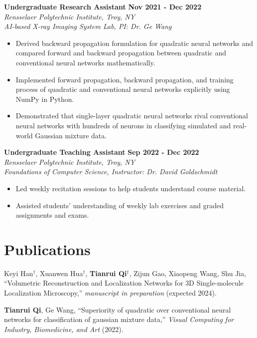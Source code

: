 \documentclass[letterpaper, 11pt]{article}
\newcommand{\subsectionvspace}{\vspace{6pt}}
\begin{document}
    \textbf{Undergraduate Research Assistant} \hfill 
    \textbf{Nov 2021 - Dec 2022} \\
    \textit{Rensselaer Polytechnic Institute, Troy, NY} \\
    \textit{AI-based X-ray Imaging System Lab, PI: Dr. Ge Wang}
    \begin{itemize}
        \item Derived backward propagation formulation for quadratic neural networks and compared forward and backward propagation between quadratic and conventional neural networks mathematically.
        \item Implemented forward propagation, backward propagation, and training process of quadratic and conventional neural networks explicitly using NumPy in Python.
        \item Demonstrated that single-layer quadratic neural networks rival conventional neural networks with hundreds of neurons in classifying simulated and real-world Gaussian mixture data.
    \end{itemize}

    \subsectionvspace

    \textbf{Undergraduate Teaching Assistant} \hfill 
    \textbf{Sep 2022 - Dec 2022} \\
    \textit{Rensselaer Polytechnic Institute, Troy, NY} \\
    \textit{Foundations of Computer Science, Instructor: Dr. David Goldschmidt}
    \begin{itemize}
        \item Led weekly recitation sessions to help students understand course material.
        \item Assisted students' understanding of weekly lab exercises and graded assignments and exams.
    \end{itemize}


\section{Publications}


    Keyi Han$^\dag$, Xuanwen Hua$^\dag$, \textbf{Tianrui Qi}$^\dag$, Zijun Gao, Xiaopeng Wang, Shu Jia, ``Volumetric Reconstruction and Localization Networks for 3D Single-molecule Localization Microscopy,'' \textit{manuscript in preparation} (expected 2024).

    \subsectionvspace

    \textbf{Tianrui Qi}, Ge Wang, ``Superiority of quadratic over conventional neural networks for classification of gaussian mixture data,'' \textit{Visual Computing for Industry, Biomedicine, and Art} (2022).
\end{document}
